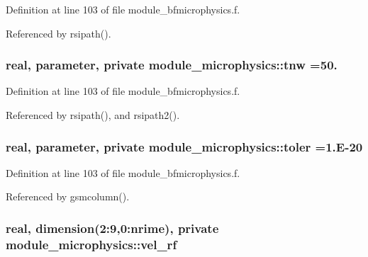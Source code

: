 Definition at line 103 of file module\+\_\+bfmicrophysics.\+f.



Referenced by rsipath().

\subsubsection[{\texorpdfstring{tnw}{tnw}}]{\setlength{\rightskip}{0pt plus 5cm}real, parameter, private module\+\_\+microphysics\+::tnw =50.\hspace{0.3cm}{\ttfamily [private]}}\hypertarget{namespacemodule__microphysics_a7759795319d20ea93e3ceb6755333fa1}{}\label{namespacemodule__microphysics_a7759795319d20ea93e3ceb6755333fa1}


Definition at line 103 of file module\+\_\+bfmicrophysics.\+f.



Referenced by rsipath(), and rsipath2().

\subsubsection[{\texorpdfstring{toler}{toler}}]{\setlength{\rightskip}{0pt plus 5cm}real, parameter, private module\+\_\+microphysics\+::toler =1.\+E-\/20\hspace{0.3cm}{\ttfamily [private]}}\hypertarget{namespacemodule__microphysics_a14f276771aea75d768df7e65c93e0092}{}\label{namespacemodule__microphysics_a14f276771aea75d768df7e65c93e0092}


Definition at line 103 of file module\+\_\+bfmicrophysics.\+f.



Referenced by gsmcolumn().

\subsubsection[{\texorpdfstring{vel\+\_\+rf}{vel_rf}}]{\setlength{\rightskip}{0pt plus 5cm}real, dimension(2\+:9,0\+:{\bf nrime}), private module\+\_\+microphysics\+::vel\+\_\+rf\hspace{0.3cm}{\ttfamily [private]}}\hypertarget{namespacemodule__microphysics_a2979744b6713e1ea75813ce1329967c6}{}\label{namespacemodule__microphysics_a2979744b6713e1ea75813ce1329967c6}


